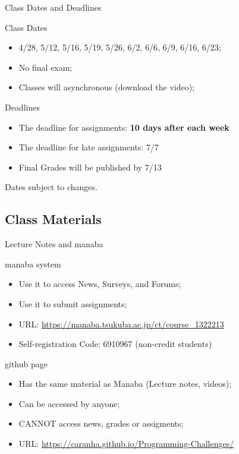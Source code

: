 \begin{frame}{Class Dates and Deadlines}
  \begin{block}{Class Dates}
    \begin{itemize}
    \item 4/28, 5/12, \alert{5/16}, 5/19, 5/26, 6/2, \alert{6/6}, 6/9, 6/16, 6/23;
    \item No final exam;
    \item Classes will asynchronous (download the video);
    \end{itemize}
  \end{block}
  \begin{block}{Deadlines}
    \begin{itemize}
      \item The deadline for assignments: {\bf 10 days after each week}
      \item The deadline for late assignments: 7/7
      \item Final Grades will be published by 7/13
    \end{itemize}
  \end{block}
  Dates subject to changes.
\end{frame}

\subsection{Class Materials}
\begin{frame}{Lecture Notes and manaba}
  \begin{block}{manaba system}
    \begin{itemize}
      \item Use it to access News, Surveys, and Forums;
      \item Use it to submit assignments;
      \medskip
      \item URL: \url{https://manaba.tsukuba.ac.jp/ct/course_1322213}
      \item Self-registration Code: 6910967 (non-credit students)
    \end{itemize}
  \end{block}
  \begin{block}{github page}
    \begin{itemize}
      \item Has the same material as Manaba (Lecture notes, videos);
      \item Can be accessed by anyone;
      \item CANNOT access news, grades or assigments;
      \medskip
      \item URL: \url{https://caranha.github.io/Programming-Challenges/}
    \end{itemize}
  \end{block}
\end{frame}


